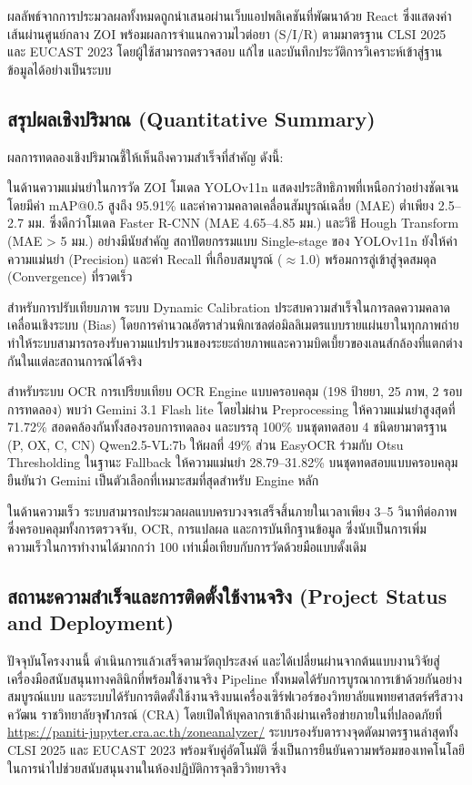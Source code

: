 ผลลัพธ์จากการประมวลผลทั้งหมดถูกนำเสนอผ่านเว็บแอปพลิเคชันที่พัฒนาด้วย React ซึ่งแสดงค่าเส้นผ่านศูนย์กลาง ZOI พร้อมผลการจำแนกความไวต่อยา (S/I/R) ตามมาตรฐาน CLSI 2025 และ EUCAST 2023 โดยผู้ใช้สามารถตรวจสอบ แก้ไข และบันทึกประวัติการวิเคราะห์เข้าสู่ฐานข้อมูลได้อย่างเป็นระบบ

\subsection{สรุปผลเชิงปริมาณ (Quantitative Summary)}

ผลการทดลองเชิงปริมาณชี้ให้เห็นถึงความสำเร็จที่สำคัญ ดังนี้:

ในด้านความแม่นยำในการวัด ZOI โมเดล YOLOv11n แสดงประสิทธิภาพที่เหนือกว่าอย่างชัดเจน โดยมีค่า mAP@0.5 สูงถึง 95.91\% และค่าความคลาดเคลื่อนสัมบูรณ์เฉลี่ย (MAE) ต่ำเพียง 2.5--2.7 มม. ซึ่งดีกว่าโมเดล Faster R-CNN (MAE 4.65--4.85 มม.) และวิธี Hough Transform (MAE > 5 มม.) อย่างมีนัยสำคัญ สถาปัตยกรรมแบบ Single-stage ของ YOLOv11n ยังให้ค่าความแม่นยำ (Precision) และค่า Recall ที่เกือบสมบูรณ์ ($\approx$1.0) พร้อมการลู่เข้าสู่จุดสมดุล (Convergence) ที่รวดเร็ว

สำหรับการปรับเทียบภาพ ระบบ Dynamic Calibration ประสบความสำเร็จในการลดความคลาดเคลื่อนเชิงระบบ (Bias) โดยการคำนวณอัตราส่วนพิกเซลต่อมิลลิเมตรแบบรายแผ่นยาในทุกภาพถ่าย ทำให้ระบบสามารถรองรับความแปรปรวนของระยะถ่ายภาพและความบิดเบี้ยวของเลนส์กล้องที่แตกต่างกันในแต่ละสถานการณ์ได้จริง

สำหรับระบบ OCR การเปรียบเทียบ OCR Engine แบบครอบคลุม (198 ป้ายยา, 25 ภาพ, 2 รอบการทดลอง) พบว่า Gemini 3.1 Flash lite โดยไม่ผ่าน Preprocessing ให้ความแม่นยำสูงสุดที่ 71.72\% สอดคล้องกันทั้งสองรอบการทดลอง และบรรลุ 100\% บนชุดทดสอบ 4 ชนิดยามาตรฐาน (P, OX, C, CN) Qwen2.5-VL:7b ให้ผลที่ 49\% ส่วน EasyOCR ร่วมกับ Otsu Thresholding ในฐานะ Fallback ให้ความแม่นยำ 28.79--31.82\% บนชุดทดสอบแบบครอบคลุม ยืนยันว่า Gemini เป็นตัวเลือกที่เหมาะสมที่สุดสำหรับ Engine หลัก

ในด้านความเร็ว ระบบสามารถประมวลผลแบบครบวงจรเสร็จสิ้นภายในเวลาเพียง 3--5 วินาทีต่อภาพ ซึ่งครอบคลุมทั้งการตรวจจับ, OCR, การแปลผล และการบันทึกฐานข้อมูล ซึ่งนับเป็นการเพิ่มความเร็วในการทำงานได้มากกว่า 100 เท่าเมื่อเทียบกับการวัดด้วยมือแบบดั้งเดิม

\subsection{สถานะความสำเร็จและการติดตั้งใช้งานจริง (Project Status and Deployment)}

ปัจจุบันโครงงานนี้ ดำเนินการแล้วเสร็จตามวัตถุประสงค์ และได้เปลี่ยนผ่านจากต้นแบบงานวิจัยสู่เครื่องมือสนับสนุนทางคลินิกที่พร้อมใช้งานจริง Pipeline ทั้งหมดได้รับการบูรณาการเข้าด้วยกันอย่างสมบูรณ์แบบ และระบบได้รับการติดตั้งใช้งานจริงบนเครื่องเซิร์ฟเวอร์ของวิทยาลัยแพทยศาสตร์ศรีสวางควัฒน ราชวิทยาลัยจุฬาภรณ์ (CRA) โดยเปิดให้บุคลากรเข้าถึงผ่านเครือข่ายภายในที่ปลอดภัยที่ \url{https://paniti-jupyter.cra.ac.th/zoneanalyzer/} ระบบรองรับตารางจุดตัดมาตรฐานล่าสุดทั้ง CLSI 2025 และ EUCAST 2023 พร้อมจับคู่อัตโนมัติ ซึ่งเป็นการยืนยันความพร้อมของเทคโนโลยีในการนำไปช่วยสนับสนุนงานในห้องปฏิบัติการจุลชีววิทยาจริง

